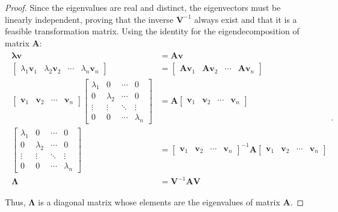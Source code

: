 \documentclass[a4paper,11pt]{book}
\numberwithin{figure}{chapter}
\numberwithin{equation}{chapter}
\numberwithin{table}{chapter}
\theoremstyle{definition}
\begin{document}
\begin{proof}
    Since the eigenvalues are real and distinct, the eigenvectors must be linearly independent, proving that the inverse $\bm{V}^{-1}$ always exist and that it is a feasible transformation matrix. Using the identity for the eigendecomposition of matrix $\bm{A}$:
    \begin{align}
    \begin{split}
        \bm{\lambda} \bm{v} &= \bm{A} \bm{v} \\
        \begin{bmatrix} \lambda_1 \bm{v}_1 & \lambda_2 \bm{v}_2 & \cdots & \lambda_n \bm{v}_n \end{bmatrix} &= \begin{bmatrix} \bm{A} \bm{v}_1 & \bm{A} \bm{v}_2 & \cdots & \bm{A} \bm{v}_n  \end{bmatrix} \\
        \begin{bmatrix} \bm{v}_1 & \bm{v}_2 & \cdots & \bm{v}_n \end{bmatrix} \begin{bmatrix} \lambda_1 & 0 & \cdots & 0 \\ 0 & \lambda_2 & \cdots & 0 \\ \vdots & \vdots & \ddots & \vdots \\ 0 & 0 & \cdots & \lambda_n  \end{bmatrix} & = \bm{A} \begin{bmatrix} \bm{v}_1 & \bm{v}_2 & \cdots & \bm{v}_n \end{bmatrix} \\
        \begin{bmatrix} \lambda_1 & 0 & \cdots & 0 \\ 0 & \lambda_2 & \cdots & 0 \\ \vdots & \vdots & \ddots & \vdots \\ 0 & 0 & \cdots & \lambda_n  \end{bmatrix} & = \begin{bmatrix} \bm{v}_1 & \bm{v}_2 & \cdots & \bm{v}_n \end{bmatrix}^{-1} \bm{A} \begin{bmatrix} \bm{v}_1 & \bm{v}_2 & \cdots & \bm{v}_n \end{bmatrix} \\
        \bm{\Lambda}  &= \bm{V}^{-1} \bm{A} \bm{V}
    \end{split}
    .\end{align}
    
    Thus, $\bm{\Lambda}$ is a diagonal matrix whose elements are the eigenvalues of matrix $\bm{A}$.
\end{proof}
\end{document}
